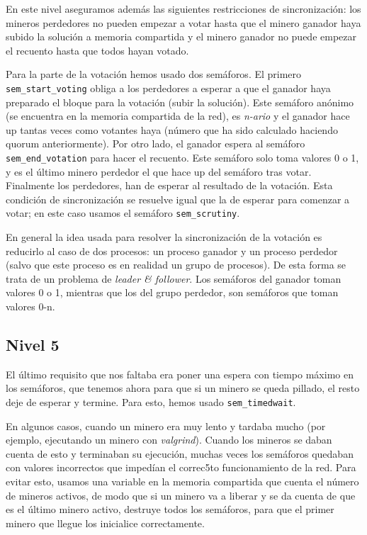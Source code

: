 \documentclass{article}
\begin{document}
En este nivel aseguramos además las siguientes restricciones de sincronización: los mineros perdedores no pueden empezar a votar hasta que el minero ganador haya subido la solución a memoria compartida y el minero ganador no puede empezar el recuento hasta que todos hayan votado.

Para la parte de la votación hemos usado dos semáforos. El primero \texttt{sem\_start\_voting} obliga a los perdedores a esperar a que el ganador haya preparado el bloque para la votación (subir la solución). Este semáforo anónimo (se encuentra en la memoria compartida de la red), es \textit{n-ario} y el ganador hace up tantas veces como votantes haya (número que ha sido calculado haciendo quorum anteriormente). Por otro lado, el ganador espera al semáforo \texttt{sem\_end\_votation} para hacer el recuento. Este semáforo solo toma valores 0 o 1, y es el último minero perdedor el que hace up del semáforo tras votar. Finalmente los perdedores, han de esperar al resultado de la votación. Esta condición de sincronización se resuelve igual que la de esperar para comenzar a votar; en este caso usamos el semáforo \texttt{sem\_scrutiny}.

En general la idea usada para resolver la sincronización de la votación es reducirlo al caso de dos procesos: un proceso ganador y un proceso perdedor (salvo que este proceso es en realidad un grupo de procesos). De esta forma se trata de un problema de \textit{leader \& follower}. Los semáforos del ganador toman valores 0 o 1, mientras que los del grupo perdedor, son semáforos que toman valores 0-n.




\subsection*{Nivel 5}

El último requisito que nos faltaba era poner una espera con tiempo máximo en los semáforos, que tenemos ahora para que si un minero se queda pillado, el resto deje de esperar y termine. Para esto, hemos usado \texttt{sem\_timedwait}. 

En algunos casos, cuando un minero era muy lento y tardaba mucho (por ejemplo, ejecutando un minero con \textit{valgrind}). Cuando los mineros se daban cuenta de esto y terminaban su ejecución, muchas veces los semáforos quedaban con valores incorrectos que impedían el correc5to funcionamiento de la red. Para evitar esto, usamos una variable en la memoria compartida que cuenta el número de mineros activos, de modo que si un minero va a liberar y se da cuenta de que es el último minero activo, destruye todos los semáforos, para que el primer minero que llegue los inicialice correctamente.
\end{document}
